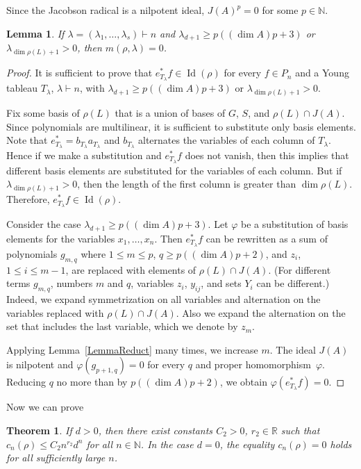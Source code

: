 \documentclass[12pt, reqno, a4paper]{amsart}
\theoremstyle{plain}
\newtheorem{lemma}{Lemma}
\newtheorem{theorem}{Theorem}
\theoremstyle{remark}
\theoremstyle{definition}
\begin{document}
Since the Jacobson radical is a nilpotent ideal,
 $J(A)^{p} = 0$ for some $p\in \mathbb N$.

\begin{lemma}\label{LemmaUpper}
If $\lambda = (\lambda_1, \ldots, \lambda_s) \vdash n$
and $\lambda_{d+1} \geqslant p((\dim A)p+3)$ or $\lambda_{\dim\rho(L)+1} > 0$, then
$m(\rho, \lambda) = 0$.
\end{lemma}

\begin{proof}
It is sufficient to prove that $e^{*}_{T_\lambda} f \in \operatorname{Id}(\rho)$
for every $f\in P_n$ and a Young tableau $T_\lambda$, $\lambda \vdash n$, with
$\lambda_{d+1} \geqslant p((\dim A)p+3)$ or $\lambda_{\dim\rho(L)+1} > 0$.

Fix some basis of $\rho(L)$ that is a union of
bases of $G$, $S$, and $\rho(L) \cap J(A)$.
Since polynomials are multilinear, it is
sufficient to substitute only basis elements.
 Note that
$e^{*}_{T_\lambda} = b_{T_\lambda} a_{T_\lambda}$
and $b_{T_\lambda}$ alternates the variables of each column
of $T_\lambda$. Hence if we make a substitution and $
e^{*}_{T_\lambda} f$ does not vanish, then this implies that different basis elements
are substituted for the variables of each column.
But if $\lambda_{\dim\rho(L)+1} > 0$, then the length of the first column is greater
than $\dim\rho(L)$. Therefore, $e^{*}_{T_\lambda} f \in \operatorname{Id}(\rho)$.

Consider the case $\lambda_{d+1} \geqslant p((\dim A)p+3)$.
 Let $\varphi$ be a substitution of basis elements for the variables
 $x_1, \ldots, x_n$.
Then $e^{*}_{T_\lambda}f$ can be rewritten as a sum of polynomials $g_{m,q}$
where $1 \leqslant m \leqslant p$, $q \geqslant p((\dim A)p+2)$, and
$z_i$, $1\leqslant i \leqslant m-1$, are replaced with
 elements of $\rho(L) \cap J(A)$.  (For different terms $g_{m,q}$,
 numbers $m$ and $q$,
 variables $z_i$, $y_{ij}$, and sets $Y_i$ can be different.)
 Indeed, we expand symmetrization on all variables and alternation on
 the variables replaced with $\rho(L) \cap J(A)$. Also we expand the alternation
 on the set that includes the last variable, which we denote by $z_m$.

 Applying Lemma~\ref{LemmaReduct} many times, we increase $m$.
 The ideal $J(A)$ is nilpotent and $\varphi(g_{p+1,q})=0$
 for every $q$ and proper homomorphism~$\varphi$.
  Reducing $q$ no more than by $p((\dim A)p+2)$,
 we obtain $\varphi(e^{*}_{T_\lambda}f)=0$.
\end{proof}
Now we can prove
\begin{theorem}\label{TheoremUpper} If $d > 0$, then
there exist constants $C_2 > 0$, $r_2 \in \mathbb R$
such that $c_n(\rho) \leqslant C_2 n^{r_2} d^n$
for all $n \in \mathbb N$. In the case $d=0$, the equality $c_n(\rho)=0$
holds for all sufficiently large $n$.
\end{theorem}
\end{document}
